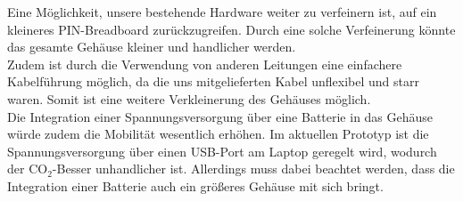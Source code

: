 \label{AusblickHW}

Eine Möglichkeit, unsere bestehende Hardware weiter zu verfeinern ist, auf ein kleineres PIN-Breadboard zurückzugreifen. Durch eine solche Verfeinerung könnte das gesamte Gehäuse kleiner und handlicher werden. \\
Zudem ist durch die Verwendung von anderen Leitungen eine einfachere Kabelführung möglich, da die uns mitgelieferten Kabel unflexibel und starr waren. Somit ist eine weitere Verkleinerung des Gehäuses möglich. \\
Die Integration einer Spannungsversorgung über eine Batterie in das Gehäuse würde zudem die Mobilität wesentlich erhöhen. Im aktuellen Prototyp ist die Spannungsversorgung über einen USB-Port am Laptop geregelt wird, wodurch der CO$_2$-Besser unhandlicher ist. Allerdings muss dabei beachtet werden, dass die Integration einer Batterie auch ein größeres Gehäuse mit sich bringt.
